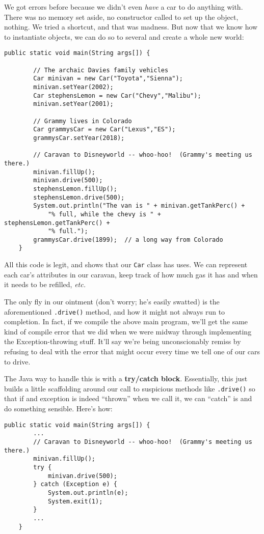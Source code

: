 We got errors before because we didn't even \textit{have} a car to do anything
with. There was no memory set aside, no constructor called to set up the
object, nothing. We tried a shortcut, and that was madness. But now that we
know how to instantiate objects, we can do so to several and create a whole
new world:

\begin{Verbatim}[samepage=true,fontsize=\footnotesize,frame=single]
    public static void main(String args[]) {

        // The archaic Davies family vehicles
        Car minivan = new Car("Toyota","Sienna");
        minivan.setYear(2002);
        Car stephensLemon = new Car("Chevy","Malibu");
        minivan.setYear(2001);

        // Grammy lives in Colorado
        Car grammysCar = new Car("Lexus","ES");
        grammysCar.setYear(2018);

        // Caravan to Disneyworld -- whoo-hoo!  (Grammy's meeting us there.)
        minivan.fillUp();
        minivan.drive(500);
        stephensLemon.fillUp();
        stephensLemon.drive(500);
        System.out.println("The van is " + minivan.getTankPerc() + 
            "% full, while the chevy is " + stephensLemon.getTankPerc() +
            "% full.");
        grammysCar.drive(1899);  // a long way from Colorado
    }
\end{Verbatim}

All this code is legit, and shows that our \texttt{Car} class has uses. We can
represent each car's attributes in our caravan, keep track of how much gas it
has and when it needs to be refilled, \textit{etc.}

The only fly in our ointment (don't worry; he's easily swatted) is the
aforementioned \texttt{.drive()} method, and how it might not always run to
completion. In fact, if we compile the above main program, we'll get the same
kind of compile error that we did when we were midway through implementing the
Exception-throwing stuff. It'll say we're being unconscionably remiss by
refusing to deal with the error that might occur every time we tell one of our
cars to drive.

The Java way to handle this is with a \textbf{try/catch block}. Essentially,
this just builds a little scaffolding around our call to suspicious methods
like \texttt{.drive()} so that if and exception is indeed ``thrown'' when we
call it, we can ``catch'' is and do something sensible. Here's how:

\begin{Verbatim}[samepage=true,fontsize=\scriptsize,frame=single]
    public static void main(String args[]) {
        ...
        // Caravan to Disneyworld -- whoo-hoo!  (Grammy's meeting us there.)
        minivan.fillUp();
        try {
            minivan.drive(500);
        } catch (Exception e) {
            System.out.println(e);
            System.exit(1);
        }
        ...
    }
\end{Verbatim}

